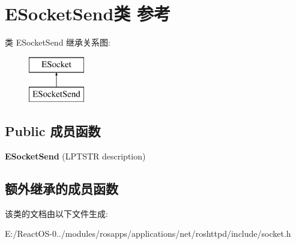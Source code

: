 \hypertarget{class_e_socket_send}{}\section{E\+Socket\+Send类 参考}
\label{class_e_socket_send}
类 E\+Socket\+Send 继承关系图\+:\begin{figure}[H]
\begin{center}
\leavevmode
\includegraphics[height=2.000000cm]{class_e_socket_send}
\end{center}
\end{figure}
\subsection*{Public 成员函数}
\begin{DoxyCompactItemize}
\item 
\mbox{\label{class_e_socket_send_ad43bd6a636e86568c98a6bb84450225a}} 
{\bfseries E\+Socket\+Send} (L\+P\+T\+S\+TR description)
\end{DoxyCompactItemize}
\subsection*{额外继承的成员函数}


该类的文档由以下文件生成\+:\begin{DoxyCompactItemize}
\item 
E\+:/\+React\+O\+S-\/0../modules/rosapps/applications/net/roshttpd/include/socket.\+h\end{DoxyCompactItemize}
